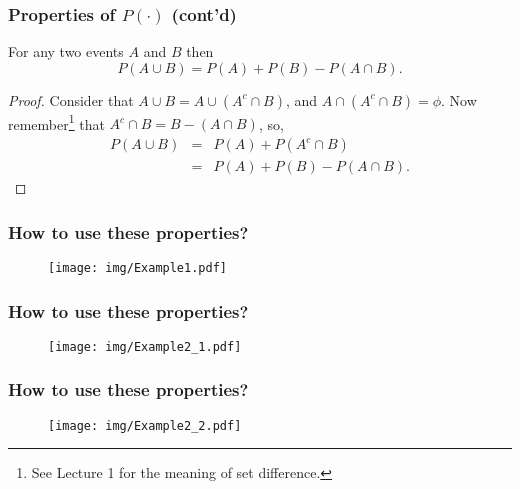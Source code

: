 \documentclass[notes=show,handout]{beamer}\usepackage[]{graphicx}\usepackage[]{color}
\newcommand{\bea}{\begin{eqnarray}}
\newcommand{\eea}{\end{eqnarray}}
\newcommand{\nn}{\nonumber}
\begin{document}
\begin{frame}
\frametitle{Properties of $P(\cdot)$ (cont'd)}
\begin{theorem}
For any two events $A$ and $B$ then
$$
P(A \cup B) = P(A) + P(B) - P(A \cap B).
$$
\end{theorem}
\vspace{0.1cm}
\begin{footnotesize}
\begin{proof}
Consider that $A\cup B = A \cup (A^c \cap B)$, and $A\cap(A^c \cap B) = \phi$. Now remember\footnote{See Lecture 1 for the meaning of set difference.} that $A^c \cap B = B -(A \cap B)$, so,
\bea
P(A\cup B) &=& P(A) + P(A^c \cap B) \nn \\
&=& P(A) + P(B) - P(A\cap B). \nn
\eea

\end{proof}
\end{footnotesize}
\end{frame}

\begin{frame}
\frametitle{How  to use these properties?}

\begin{example} 

\begin{figure}[h!]
\centering
\texttt{[image: img/Example1.pdf]}
\end{figure}
\end{example}
\end{frame}


\begin{frame}
\frametitle{How to use these properties?}

\begin{example} 

\begin{figure}[h!]
\centering
\texttt{[image: img/Example2\_1.pdf]}
\end{figure}
\end{example}
\end{frame}

\begin{frame}
\frametitle{How to use these properties?}

\begin{example} 

\begin{figure}[h!]
\centering
\texttt{[image: img/Example2\_2.pdf]}
\end{figure}
\end{example}
\end{frame}
\end{document}
